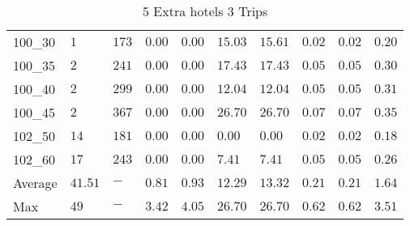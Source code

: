 \begin{center}
\begin{table}[]
\begin{adjustwidth}{-0.4in}{-1in}
\begin{tabular}{|lll|l|l|ll|lll|}
\hline
100\_30  & $1   $ & $173 $ & $\bm{0.00}$ & $\bm{0.00}$ & $15.03$ & $15.61$ & $0.02$ & $0.02$   & $0.20$ \\
100\_35  & $2   $ & $241 $ & $\bm{0.00}$ & $\bm{0.00}$ & $17.43$ & $17.43$ & $0.05$ & $0.05$   & $0.30$ \\
100\_40  & $2   $ & $299 $ & $\bm{0.00}$ & $\bm{0.00}$ & $12.04$ & $12.04$ & $0.05$ & $0.05$   & $0.31$ \\
100\_45  & $2   $ & $367 $ & $\bm{0.00}$ & $\bm{0.00}$ & $26.70$ & $26.70$ & $0.07$ & $0.07$   & $0.35$ \\
\hline
102\_50  & $14  $ & $181 $ & $\bm{0.00}$ & $\bm{0.00}$ & $\bm{0.00}$  & $\bm{0.00}$  & $0.02$ & $0.02$   & $0.18$ \\
102\_60  & $17  $ & $243 $ & $\bm{0.00}$ & $\bm{0.00}$ & $7.41$  & $7.41$  & $0.05$ & $0.05$   & $0.26$ \\
\hline
Average & $41.51$ & $-   $ & $0.81$ & $0.93$ & $12.29$ & $13.32$ & $0.21$ & $0.21$   & $1.64$ \\
Max     & $49   $ & $-   $ & $3.42$ & $4.05$ & $26.70$ & $26.70$ & $0.62$ & $0.62$   & $3.51$ \\
\hline
\end{tabular}
    \end{adjustwidth}
    \caption{5 Extra hotels 3 Trips}
    \label{5-3}
    \end{table}
\end{center}
